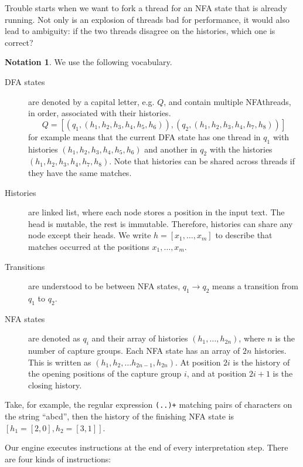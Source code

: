 \documentclass[english]{sigplanconf}
\theoremstyle{definition}
\newtheorem*{notation}{Notation}
\begin{document}
Trouble starts when we want to fork a thread for an NFA state that
is already running. Not only is an explosion of threads bad for
performance, it would also lead to ambiguity: if the two threads
disagree on the histories, which one is correct?

\begin{notation}

We use the following vocabulary.

\begin{description}
\item[DFA states] are denoted by a capital letter, e.g. $Q$, and
	contain multiple NFAthreads, in order, associated with their
	histories.  \[Q=[(q_1, (h_1, h_2, h_3, h_4, h_5, h_6)),
	(q_2, (h_1, h_2, h_3, h_4, h_7, h_8))]\] for example means
	that the current DFA state has one thread in $q_1$ with
	histories $(h_1, h_2, h_3, h_4, h_5, h_6)$ and another in
	$q_2$ with the histories $(h_1, h_2, h_3, h_4, h_7, h_8)$.
	Note that histories can be shared across threads if they
	have the same matches.
\item[Histories] are linked list, where each node stores a position in the input text.
The head is mutable, the rest is immutable. Therefore, histories can share any node
except their heads. We write $h=[x_1, \dots, x_m]$ to describe that matches occurred
at the positions $x_1, \dots, x_m$. 
\item[Transitions] are  understood to be between NFA states,
$q_1\rightarrow q_2$ means a transition from $q_1$ to $q_2$.
\item[NFA states] are denoted as $q_i$ and their array of histories
$(h_1, \dots, h_{2n})$, where $n$ is the number of capture groups.
Each NFA state has an array of $2n$ histories. This is written as
$(h_1, h_2, \dots h_{2n-1}, h_{2n})$. At position $2i$  is the
history of the opening positions of the capture group $i$, and at
position $2i+1$ is the closing history.
\end{description}

Take, for example, the regular expression \texttt{(..)+} matching
pairs of characters on the string ``abcd'', then the history of the
finishing NFA state is $[h_1=[2,0], h_2=[3,1]]$.

Our engine executes instructions at the end of every interpretation
step. There are four kinds of instructions:


\end{notation}
\end{document}
